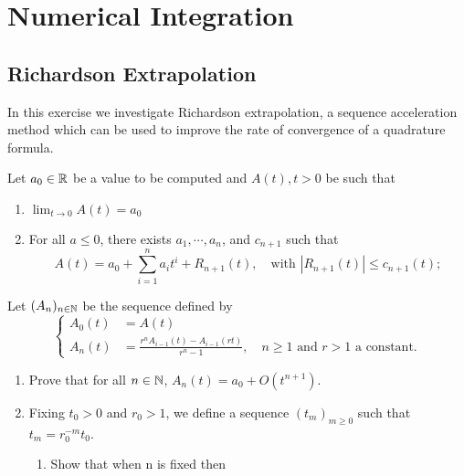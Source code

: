 \renewcommand{\chaptername}{Assignment}
\chapter{Numerical Integration}

\section{Richardson Extrapolation}
In this exercise we investigate Richardson extrapolation, a sequence acceleration method which can be used to improve the rate of convergence of a quadrature formula.

Let \(a_0\in\mathbb{R}\) be a value to be computed and \(A(t), t > 0\) be such that
\begin{enumerate}
	\item \(\lim_{t\to0}A(t)=a_0\)
	\item For all \(a\leq0\), there exists \(a_1,\cdots,a_n\), and \(c_{n+1}\) such that
	\[ A(t)=a_0+\sum_{i=1}^{n}a_i t^i+R_{n+1}(t),\quad\text{with } |R_{n+1}(t)|\leq c_{n+1}(t);  \]
\end{enumerate}
Let \((A_n)_{n\in\mathbb{N}}\) be the sequence defined by
\[ \begin{cases} A_0(t)&= A(t) \\ A_n(t)&=\frac{r^nA_{i-1}(t)-A_{i-1}(rt)}{r^n-1},\quad n\geq1 \text{ and } r>1 \text{ a constant.} \end{cases} \]
\begin{enumerate}
	\item Prove that for all \(n\in\mathbb{N}\), \(A_n(t)= a_0 + O(t^{n+1})\).
	\item Fixing \(t_0 > 0\) and \(r_0 > 1\), we define a sequence \((t_m)_{m\geq0}\) such that \(t_m = r_0^{-m} t_0\).
	\begin{enumerate}
		\item Show that when n is fixed then
	\end{enumerate}


\end{enumerate}